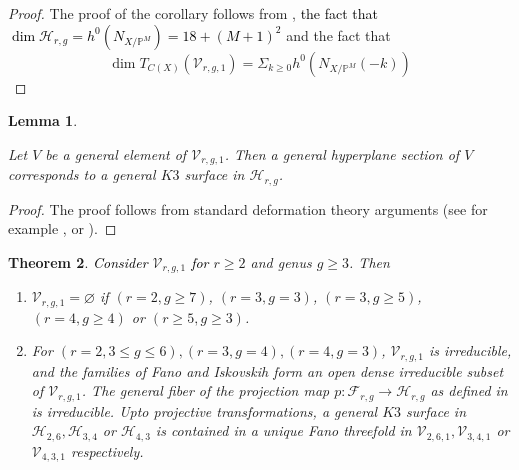 \documentclass[11pt,twoside]{amsart}
\theoremstyle{plain}
\numberwithin{equation}{section}
\newtheorem{theorem}{Theorem}[section]
\newtheorem{lemma}[theorem]{Lemma}
\theoremstyle{definition}
\begin{document}
\begin{proof}
    The proof of the corollary follows from , \textcolor{black}{the fact that $\operatorname{dim}\mathcal{H}_{r,g} = h^0(N_{X/\mathbb{P}^M}) =  18+(M+1)^2$} and the fact that $$\operatorname{dim}T_{C(X)}(\mathcal{V}_{r,g,1}) = \Sigma_{k \geq 0} h^0(N_{X/\mathbb{P}^M}(-k))$$
\end{proof}

\begin{lemma}\label{hyperplane section of a general fano is a general K3}

Let $V$ be a general element of $\mathcal{V}_{r,g,1}$. Then a general hyperplane section of $V$ corresponds to a general $K3$ surface in $\mathcal{H}_{r,g}$.
    
\end{lemma}

\begin{proof}
    The proof follows from standard deformation theory arguments (see for example \cite[Lemma $3.7$]{CLM98}, or \cite{Bea02}).
\end{proof}

\begin{theorem}\label{classification of fanos with index two}
\textcolor{black}{Consider} $\mathcal{V}_{r,g,1}$ \textcolor{black}{for} $r \geq 2$ and genus $g \geq 3$. Then 
\begin{enumerate}
    \item $\mathcal{V}_{r,g,1} = \varnothing$ if $(r = 2, g \geq 7)$, $(r = 3, g = 3)$, $(r = 3, g \geq 5)$, $(r = 4, g \geq 4)$ or $(r \geq 5, g \geq 3)$. 
    \item For $(r = 2, 3 \leq g \leq 6), (r = 3, g = 4), (r = 4, g = 3)$, $\mathcal{V}_{r,g,1}$ is irreducible, and the families of Fano and Iskovskih form an open dense irreducible subset of $\mathcal{V}_{r,g,1}$. The general fiber of the projection map $p: \mathcal{F}_{r,g} \to \mathcal{H}_{r,g}$ as defined in  is irreducible. Upto projective transformations, a general $K3$ surface in $\mathcal{H}_{2,6}, \mathcal{H}_{3,4}$ or $ \mathcal{H}_{4,3}$ is contained in a unique Fano threefold in $\mathcal{V}_{2,6,1}, \mathcal{V}_{3,4,1}$ or $ \mathcal{V}_{4,3,1}$ respectively.
\end{enumerate}
\end{theorem}
\end{document}
